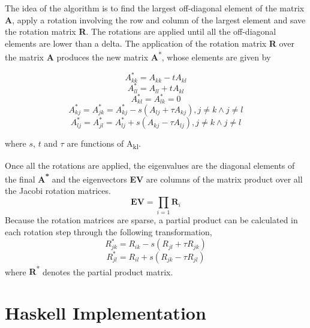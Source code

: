 \documentclass{tmr}
\begin{document}
The idea of the algorithm is to find the largest off-diagonal element of
the matrix \textbf{A}, apply a rotation involving the row and column of
the largest element and save the rotation matrix \textbf{R}.
%
The rotations are applied until all the off-diagonal elements are lower
than a delta.
%
The application of the rotation matrix \textbf{R} over the matrix
\textbf{A} produces the new matrix {\textbf A\textsuperscript{*}}, whose
elements are given by

\begin{equation}\label{1} A^{*}_{kk} = A_{kk}  -  t A_{kl} \end{equation}
\begin{equation}\label{2} A^{*}_{ll} = A_{ll} +   t A_{kl} \end{equation}
\begin{equation}\label{3} A^{*}_{kl} =A^{*}_{lk} = 0       \end{equation}
\begin{equation}\label{4}
A^{*}_{kj} =A^{*}_{jk} = A^{*}_{kj} - s (A_{lj} + \tau A_{kj}), j \not = k \wedge j \not = l 
\end{equation}
\begin{equation}\label{5}
A^{*}_{lj} =A^{*}_{jl} = A^{*}_{lj} + s (A_{kj} - \tau A_{lj}), j \not = k \wedge j \not = l 
\end{equation}

where $s$, $t$ and $\tau$ are functions of A\textsubscript{kl}.

Once all the rotations are applied, the eigenvalues are the diagonal
elements of the final \textbf{A\textsuperscript{*}} and the eigenvectors
{\bf EV} are columns of the matrix product over all the Jacobi rotation
matrices.
%
\[ \mathbf{EV} = \prod_{i=1} \mathbf{R}_i \]
%
Because the rotation matrices are sparse, a partial product can be
calculated in each rotation step through the following transformation,
%
\begin{equation}\label{6} R^{*}_{jk} = R_{ik}  -  s (R_{jl} + \tau R_{jk}) \end{equation}
\begin{equation}\label{7} R^{*}_{jl} = R_{il}  +  s (R_{jk} - \tau R_{jl}) \end{equation}
%
where {\textbf R\textsuperscript{*}} denotes the partial product matrix.

\section{Haskell Implementation}
\end{document}
